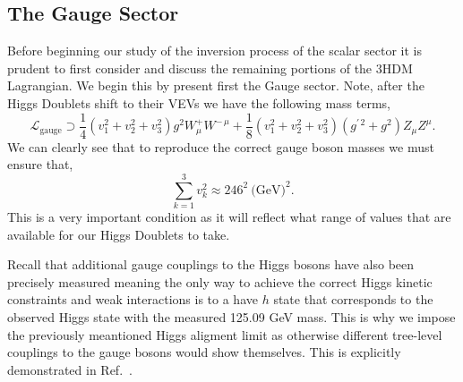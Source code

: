 \documentclass[10pt]{book}
\renewcommand{\(}{\left(}
\renewcommand{\)}{\right)}
\renewcommand{\[}{\left[}
\renewcommand{\]}{\right]}
\begin{document}
% 
%

\subsection{The Gauge Sector}

Before beginning our study of the inversion process of the scalar sector it is prudent to first consider and discuss the remaining portions of the 3HDM Lagrangian. 
%
We begin this by present first the Gauge sector. 
%
Note, after the Higgs Doublets shift to their VEVs we have the following mass terms, 
%
\begin{equation}
\mathcal{L}_{\text{gauge}} \supset \frac{1}{4} \left( v_1^2 + v_2^2  + v_3^2 \right) g^2 W^+_\mu W^{-\,\mu} + \frac{1}{8} \left(  v_1^2 + v_2^2  + v_3^2  \right) \left( g^{\prime \, 2} + g^2 \right) Z_\mu Z^\mu  .
\end{equation}
%
We can clearly see that to reproduce the correct gauge boson masses we must ensure that,
%
\begin{equation}
\label{eq:VEV_Condition}
\sum_{k=1}^3 v_k^2 \approx 246^2 \ \text{(GeV)}^2  . 
\end{equation}
%
This is a very important condition as it will reflect what range of values that are available for our Higgs Doublets to take.

Recall that additional gauge couplings to the Higgs bosons have also been precisely measured meaning the only way to achieve the correct Higgs kinetic constraints and weak interactions is to a have $h$ state that corresponds to the observed Higgs state with the measured 125.09 GeV mass. 
%
This is why we impose the previously meantioned Higgs aligment limit as otherwise different tree-level couplings to the gauge bosons would show themselves. 
%
This is explicitly demonstrated in Ref.~\cite{das2015implications}. 
\end{document}
